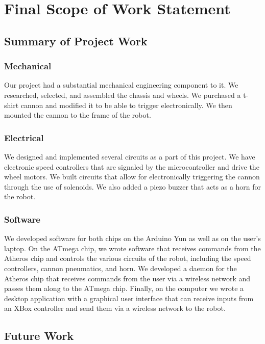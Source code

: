 \documentclass[letterpaper,12pt]{article}
\begin{document}
\section{Final Scope of Work Statement}
\label{sec:finalscope}

\subsection{Summary of Project Work}
\subsubsection{Mechanical}
Our project had a substantial mechanical engineering component to it. We
researched, selected, and assembled the chassis and wheels. We purchased a
t-shirt cannon and modified it to be able to trigger electronically. We then
mounted the cannon to the frame of the robot.

\subsubsection{Electrical}
We designed and implemented several circuits as a part of this project. We have
electronic speed controllers that are signaled by the microcontroller and drive
the wheel motors. We built circuits that allow for electronically triggering the
cannon through the use of solenoids. We also added a piezo buzzer that acts as a
horn for the robot.

\subsubsection{Software}
We developed software for both chips on the Arduino Yun as well as on the user's
laptop. On the ATmega chip, we wrote software that receives commands from the
Atheros chip and controls the various circuits of the robot, including the speed
controllers, cannon pneumatics, and horn. We developed a daemon for the Atheros
chip that receives commands from the user via a wireless network and passes them
along to the ATmega chip. Finally, on the computer we wrote a desktop
application with a graphical user interface that can receive inputs from an XBox
controller and send them via a wireless network to the robot.

\subsection{Future Work}
\end{document}
